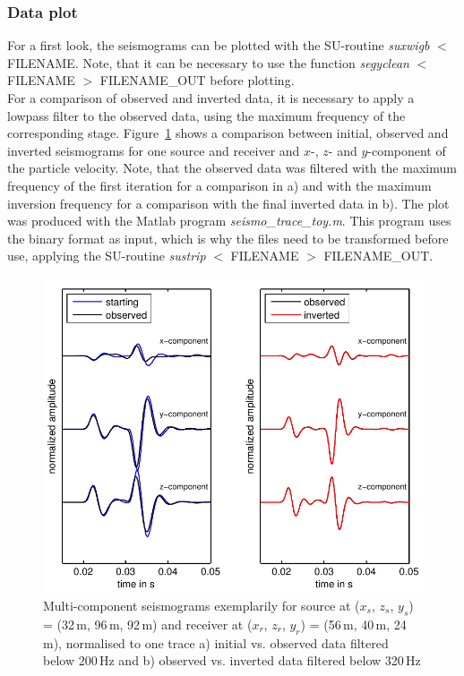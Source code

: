 \subsubsection*{Data plot}
For a first look, the seismograms can be plotted with the SU-routine \textit{suxwigb} $<$ FILENAME. Note, that it can be necessary to use the function \textit{segyclean} $<$ FILENAME $>$ FILENAME\_OUT before plotting.\\
For a comparison of observed and inverted data, it is necessary to apply a lowpass filter to the observed data, using the maximum frequency of the corresponding stage. Figure~\ref{fig:toy_seismo1} shows a comparison between initial, observed and inverted seismograms for one source and receiver and $x$-, $z$- and $y$-component of the particle velocity. Note, that the observed data was filtered with the maximum frequency of the first iteration for a comparison in a) and with the maximum inversion frequency for a comparison with the final inverted data in b). The plot was produced with the Matlab program \textit{seismo\_trace\_toy.m}. This program uses the binary format as input, which is why the files need to be transformed before use, applying the SU-routine \textit{sustrip} $<$ FILENAME $>$ FILENAME\_OUT.
\begin{figure}[h!]
\begin{center}
\includegraphics[width=\textwidth]{fig_toy/seismo_trace_toy}
\caption[Toy example - observed, initial and inverted seismograms]{Multi-component seismograms exemplarily for source at ($x_s$, $z_s$, $y_s$) = (32\,m, 96\,m, 92\,m) and receiver at ($x_r$, $z_r$, $y_r$) = (56\,m, 40\,m, 24\,m), normalised to one trace a) initial vs. observed data filtered below 200\,Hz and b) observed vs. inverted data filtered below 320\,Hz} \label{fig:toy_seismo1}
\end{center}
\end{figure}
